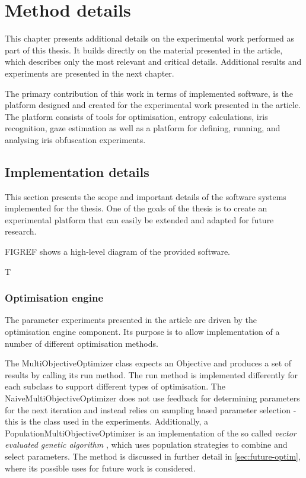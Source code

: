 \chapter{Method details}
This chapter presents additional details on the experimental work performed as part of this thesis. It builds directly on the material presented in the article, which describes only the most relevant and critical details. Additional results and experiments are presented in the next chapter.

The primary contribution of this work in terms of implemented software, is the platform designed and created for the experimental work presented in the article. The platform consists of tools for optimisation, entropy calculations, iris recognition, gaze estimation as well as a platform for defining, running, and analysing iris obfuscation experiments. 


\section{Implementation details}
This section presents the scope and important details of the software systems implemented for the thesis. One of the goals of the thesis is to create an experimental platform that can easily be extended and adapted for future research.

FIGREF shows a high-level diagram of the provided software. 

T


\subsection{Optimisation engine}\label{sec:detail-opt}
The parameter experiments presented in the article are driven by the optimisation engine component. Its purpose is to allow implementation of a number of different optimisation methods.

The MultiObjectiveOptimizer class expects an Objective and produces a set of results by calling its run method. The run method is implemented differently for each subclass to support different types of optimisation. The NaiveMultiObjectiveOptimizer does not use feedback for determining parameters for the next iteration and instead relies on sampling based parameter selection - this is the class used in the experiments. Additionally, a PopulationMultiObjectiveOptimizer is an implementation of the so called \textit{vector evaluated genetic algorithm} \parencite{kochenderfer2019algorithms}, which uses population strategies to combine and select parameters. The method is discussed in further detail in \cref{sec:future-optim}, where its possible uses for future work is considered.

